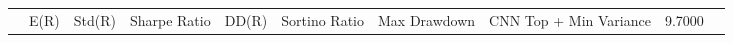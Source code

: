 \begin{tabular}{lrrrrrrrrr}
 & E(R) & Std(R) & Sharpe Ratio & DD(R) & Sortino Ratio & Max Drawdown & %
CNN Top + Min Variance & 9.7000%
\end{tabular}
